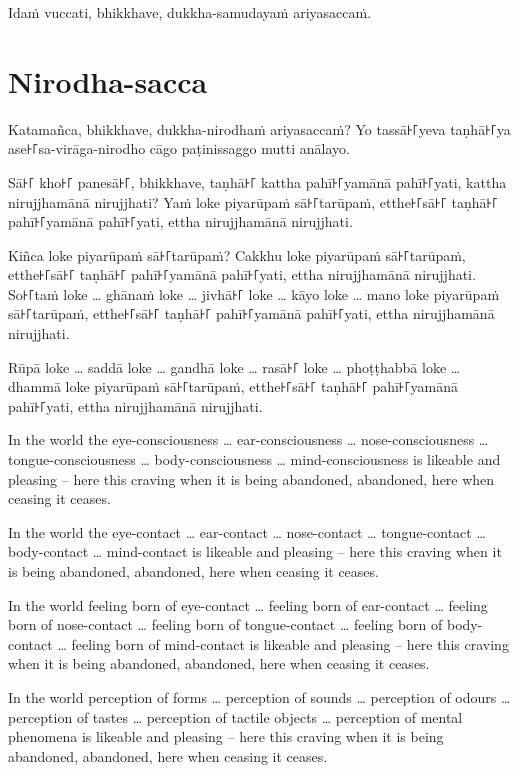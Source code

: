 Idaṁ vuccati, bhikkhave, dukkha-samudayaṁ ariyasaccaṁ.

\section*{Nirodha-sacca}

Katamañca, bhikkhave, dukkha-nirodhaṁ ariyasaccaṁ? Yo tassā꜔꜒yeva taṇhā꜔꜒ya
ase꜔꜒sa-virāga-nirodho cāgo paṭinissaggo mutti anālayo.

Sā꜔꜒ kho꜔꜒ panesā꜔꜒, bhikkhave, taṇhā꜔꜒ kattha pahī꜔꜒yamānā pahī꜔꜒yati, kattha nirujjhamānā
nirujjhati? Yaṁ loke piyarūpaṁ sā꜔꜒tarūpaṁ, etthe꜔꜒sā꜔꜒ taṇhā꜔꜒ pahī꜔꜒yamānā pahī꜔꜒yati,
ettha nirujjhamānā nirujjhati.

Kiñca loke piyarūpaṁ sā꜔꜒tarūpaṁ? Cakkhu loke piyarūpaṁ sā꜔꜒tarūpaṁ, etthe꜔꜒sā꜔꜒ taṇhā꜔꜒
pahī꜔꜒yamānā pahī꜔꜒yati, ettha nirujjhamānā nirujjhati. So꜔꜒taṁ loke \ldots{}
ghānaṁ loke \ldots{} jivhā꜔꜒ loke \ldots{} kāyo loke \ldots{} mano loke
piyarūpaṁ sā꜔꜒tarūpaṁ, etthe꜔꜒sā꜔꜒ taṇhā꜔꜒ pahī꜔꜒yamānā pahī꜔꜒yati, ettha nirujjhamānā
nirujjhati.

Rūpā loke \ldots{} saddā loke \ldots{} gandhā loke \ldots{} rasā꜔꜒ loke \ldots{}
phoṭṭhabbā loke \ldots{} dhammā loke piyarūpaṁ sā꜔꜒tarūpaṁ, etthe꜔꜒sā꜔꜒ taṇhā꜔꜒
pahī꜔꜒yamānā pahī꜔꜒yati, ettha nirujjhamānā nirujjhati.

\englishPage

In the world the eye-consciousness \ldots{} ear-consciousness \ldots{}
nose-consciousness \ldots{} tongue-consciousness \ldots{} body-consciousness
\ldots{} mind-consciousness is likeable and pleasing -- here this craving when
it is being abandoned, abandoned, here when ceasing it ceases.

In the world the eye-contact \ldots{} ear-contact \ldots{} nose-contact \ldots{}
tongue-contact \ldots{} body-contact \ldots{} mind-contact is likeable and
pleasing -- here this craving when it is being abandoned, abandoned, here when
ceasing it ceases.

In the world feeling born of eye-contact \ldots{} feeling born of ear-contact
\ldots{} feeling born of nose-contact \ldots{} feeling born of tongue-contact
\ldots{} feeling born of body-contact \ldots{} feeling born of mind-contact is
likeable and pleasing -- here this craving when it is being abandoned, abandoned,
here when ceasing it ceases.

In the world perception of forms \ldots{} perception of sounds \ldots{}
perception of odours \ldots{} perception of tastes \ldots{} perception of
tactile objects \ldots{} perception of mental phenomena is likeable and pleasing
-- here this craving when it is being abandoned, abandoned, here when ceasing it
ceases.

